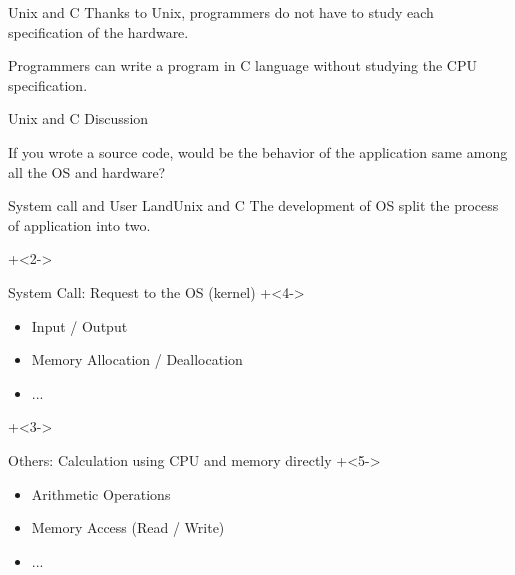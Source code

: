 \begin{frame}{Unix and C}{}
    Thanks to Unix, programmers do not have to study each specification of the hardware.
    \vspace{4ex}

    Programmers can write a program in C language without studying the CPU specification.
\end{frame}


\begin{frame}{Unix and C}{}
    Discussion
    \vspace{4ex}

    If you wrote a source code, would be the behavior of the application same among all the OS and hardware?
\end{frame}


\begin{frame}{System call and User Land}{Unix and C}
    The development of OS split the process of application into two.
    \vspace{2ex}

    \onslide+<2->{{\small
        System Call: Request to the OS (kernel)
        \onslide+<4->{{\footnotesize
            \begin{itemize}
                \item   Input / Output
                \item   Memory Allocation / Deallocation
                \item   ...
            \end{itemize}
        }}
    }}

    \onslide+<3->{{\small
        Others: Calculation using CPU and memory directly
        \onslide+<5->{{\footnotesize
            \begin{itemize}
                \item   Arithmetic Operations
                \item   Memory Access (Read / Write)
                \item   ...
            \end{itemize}
        }}
    }}
\end{frame}
